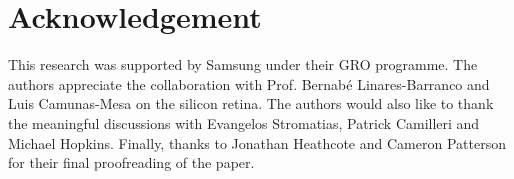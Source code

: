 \documentclass[journal]{journal}
\begin{document}
\section{Acknowledgement}
\label{sec:ack}
This research was supported by Samsung under their GRO programme.
The authors appreciate the collaboration with Prof. Bernab{\'e} Linares-Barranco and Luis Camunas-Mesa on the silicon retina.
The authors would also like to thank the meaningful discussions with Evangelos Stromatias, Patrick Camilleri and Michael Hopkins.
Finally, thanks to Jonathan Heathcote and Cameron Patterson for their final proofreading of the paper.
%
%
%
%
%
\end{document}
